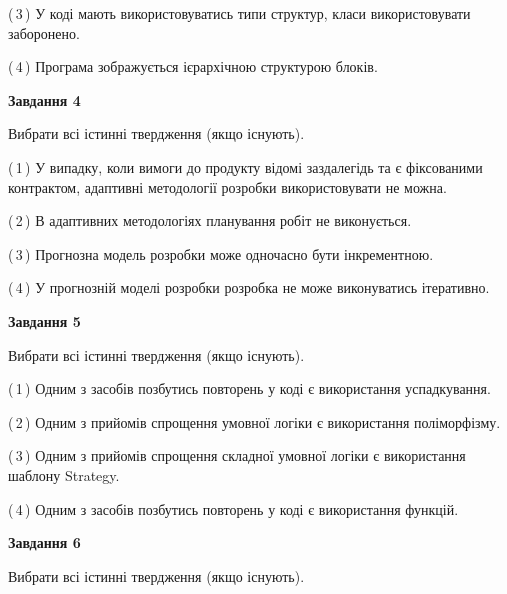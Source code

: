 \documentclass[10pt, ukrainian]{article}
\begin{document}
{\begin {large}
(\,3\,) У коді мають використовуватись типи структур, класи використовувати заборонено. %



(\,4\,) Програма зображується ієрархічною структурою блоків.%


{\begin {center}\textbf{Завдання 4}\end {center}}\par
Вибрати всі істинні твердження (якщо існують).\par
\vspace{2mm}



(\,1\,) У випадку, коли вимоги до продукту відомі заздалегідь та є фіксованими контрактом, адаптивні методології розробки використовувати не можна. %



(\,2\,) В адаптивних методологіях планування робіт не виконується. %



(\,3\,) Прогнозна модель розробки може одночасно бути інкрементною. %



(\,4\,) У прогнозній моделі розробки розробка не може виконуватись ітеративно. %


{\begin {center}\textbf{Завдання 5}\end {center}}\par
Вибрати всі істинні твердження (якщо існують).\par
\vspace{2mm}



(\,1\,) Одним з засобів позбутись повторень у коді є використання успадкування. %



(\,2\,) Одним з прийомів спрощення умовної логіки є використання поліморфізму. %



(\,3\,) Одним з прийомів спрощення складної умовної логіки є використання шаблону Strategy. %



(\,4\,) Одним з засобів позбутись повторень у коді є використання функцій. %

\newpage

{\begin {center}\textbf{Завдання 6}\end {center}}\par
Вибрати всі істинні твердження (якщо існують).\par
\vspace{2mm}




\end{large}}
\end{document}
